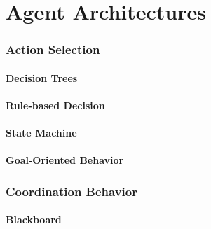 \part{Agent Architectures}
\begin{bibliographysection}

	\section{Action Selection}
	\subsection{Decision Trees}
	
	\subsection{Rule-based Decision}
	
	\subsection{State Machine}
	
	\subsection{Goal-Oriented Behavior}
	

	\section{Coordination Behavior}
	\subsection{Blackboard}
	

\end{bibliographysection}

